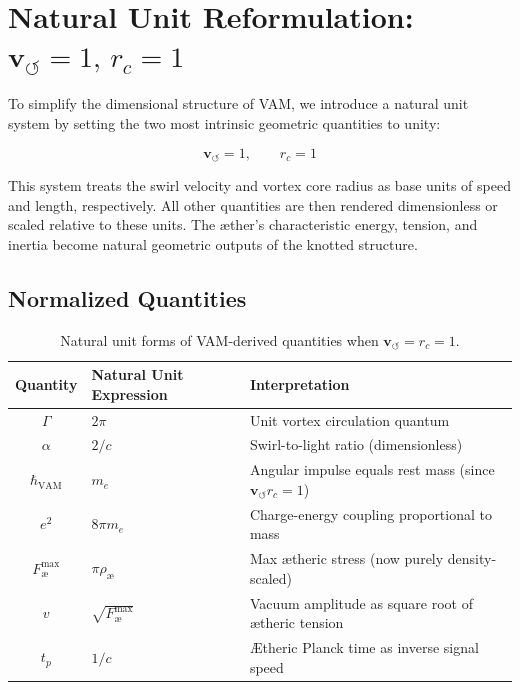 \section*{Natural Unit Reformulation: \( \mathbf{v}_{\scriptscriptstyle\boldsymbol{\circlearrowleft}} = 1, \, r_c = 1 \)}

To simplify the dimensional structure of VAM, we introduce a natural unit system by setting the two most intrinsic geometric quantities to unity:

\[
\mathbf{v}_{\scriptscriptstyle\boldsymbol{\circlearrowleft}} = 1, \qquad r_c = 1
\]

This system treats the swirl velocity and vortex core radius as base units of speed and length, respectively. All other quantities are then rendered dimensionless or scaled relative to these units. The æther's characteristic energy, tension, and inertia become natural geometric outputs of the knotted structure.

\subsection*{Normalized Quantities}

\begin{table}[H]
    \centering
    \footnotesize
    \renewcommand{\arraystretch}{1.3}
    \begin{tabular}{|c|l|l|}
        \hline
        \textbf{Quantity} & \textbf{Natural Unit Expression} & \textbf{Interpretation} \\
        \hline
        \( \Gamma \) & \( 2\pi \) & Unit vortex circulation quantum \\
        \hline
        \( \alpha \) & \( 2 / c \) & Swirl-to-light ratio (dimensionless) \\
        \hline
        \( \hbar_{\text{VAM}} \) & \( m_e \) & Angular impulse equals rest mass (since \( \mathbf{v}_{\scriptscriptstyle\boldsymbol{\circlearrowleft}} r_c = 1 \)) \\
        \hline
        \( e^2 \) & \( 8\pi m_e \) & Charge-energy coupling proportional to mass \\
        \hline
        \( F^{\text{max}}_{\text{\ae}} \) & \( \pi \rho_\text{\ae} \) & Max ætheric stress (now purely density-scaled) \\
        \hline
        \( v \) & \( \sqrt{F^{\text{max}}_{\text{\ae}}} \) & Vacuum amplitude as square root of ætheric tension \\
        \hline
        \( t_p \) & \( 1/c \) & Ætheric Planck time as inverse signal speed \\
        \hline
    \end{tabular}
    \caption{Natural unit forms of VAM-derived quantities when \( \mathbf{v}_{\scriptscriptstyle\boldsymbol{\circlearrowleft}} = r_c = 1 \).}
    \label{tab:natural_units_vam}
\end{table}

